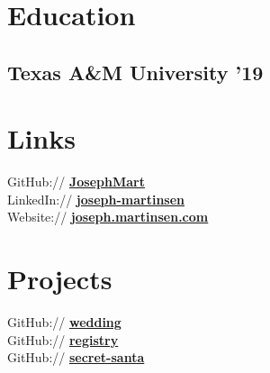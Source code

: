 \documentclass[letterpaper]{deedy-resume} %
\begin{document}
\begin{minipage}[t]{0.33\textwidth} %


\section{Education}

\subsection{Texas A\&M University '19}


\sectionspace %


\section{Links} 

GitHub:// \href{https://github.com/JosephMart}{\bf JosephMart} \\
LinkedIn:// \href{https://www.linkedin.com/in/joseph-martinsen}{\bf joseph-martinsen} \\
Website:// \href{http://joseph.martinsen.com}{\bf joseph.martinsen.com} \\
\sectionspace %

\section{Projects} 

GitHub:// \href{https://github.com/JosephMart/wedding}{\bf wedding} \\
GitHub:// \href{https://github.com/JosephMart/registry}{\bf registry} \\
GitHub:// \href{https://github.com/JosephMart/secret-santa-old}{\bf secret-santa} \\
\sectionspace %


\end{minipage}
\end{document}
